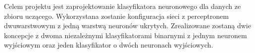 \indent Celem projektu jest zaprojektowanie klasyfikatora neuronowego dla
danych ze zbioru uczącego. Wykorzystana zostanie konfiguracja sieci z perceptronem dwuwarstwowym
z jedną warstwą neuronów ukrytych. Zrealizowane zostaną dwie koncepcje z dwoma niezależnymi klasyfikatorami binarnymi z jednym neuronem wyjściowym oraz jeden klasyfikator o dwóch neuronach wyjściowych.
